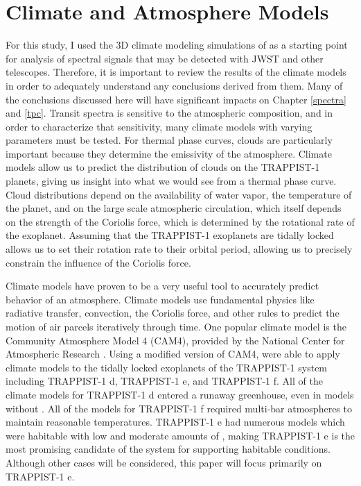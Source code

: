 \chapter{Climate and Atmosphere Models}
\label{models}
For this study, I used the 3D climate modeling simulations of
 \citet{wolf17,wolf18} as a starting point for analysis of spectral signals that
 may be detected with JWST and other telescopes. Therefore, it is important to
 review the results of the climate models in order to adequately understand any
 conclusions derived from them. Many of the conclusions discussed here will have
 significant impacts on Chapter \ref{spectra} and \ref{tpc}.
 Transit spectra is sensitive to the
 atmospheric composition, and in order to characterize that sensitivity, many
 climate models with varying parameters must be tested. For thermal phase
 curves, clouds are particularly important because they determine the
 emissivity of the atmosphere. Climate models allow us to predict
 the distribution of clouds on the TRAPPIST-1 planets, giving us insight into
 what we would see from a thermal phase curve. Cloud distributions depend on
 the availability of water vapor, the temperature of the planet, and on the
 large scale atmospheric circulation, which itself depends on the strength of
 the Coriolis force, which is determined by the rotational rate of the
 exoplanet. Assuming that the TRAPPIST-1 exoplanets are tidally locked allows us
 to set their rotation rate to their orbital period, allowing us to precisely
 constrain the influence of the Coriolis force.

Climate models have proven to be a very useful tool to accurately predict
 behavior of an atmosphere. Climate models use fundamental physics like
 radiative transfer, convection, the Coriolis force, and other rules to predict
 the motion of air parcels iteratively through time. One popular climate model
 is the Community Atmosphere Model 4 (CAM4), provided by the National Center for
 Atmospheric Research \citep{CAM5}. Using a modified version of CAM4,
 \citet{wolf17, wolf18} were able to apply climate models to the tidally locked
 exoplanets of the TRAPPIST-1 system including TRAPPIST-1 d, TRAPPIST-1 e, and
 TRAPPIST-1 f. All of the climate models for TRAPPIST-1 d entered a runaway
 greenhouse, even in models without . All of the models for
 TRAPPIST-1 f required multi-bar  atmospheres to maintain reasonable
 temperatures. TRAPPIST-1 e had numerous models which were habitable with low
 and moderate amounts of , making TRAPPIST-1 e is the most promising
 candidate of the system for supporting habitable conditions. Although other
 cases will be considered, this paper will focus primarily on TRAPPIST-1 e.


